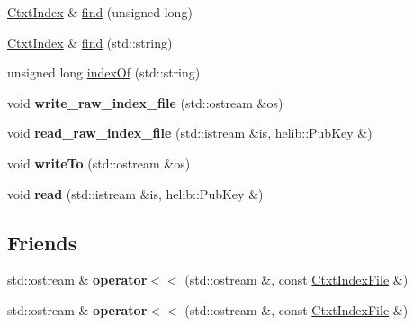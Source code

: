 \begin{DoxyCompactItemize}
\item 
\hyperlink{classHDB__supergate___1_1CtxtIndex}{Ctxt\+Index} \& \hyperlink{classHDB__supergate___1_1CtxtIndexFile_a22e64dc85f8e2ec050ee00820d31d083}{find} (unsigned long)
\item 
\hyperlink{classHDB__supergate___1_1CtxtIndex}{Ctxt\+Index} \& \hyperlink{classHDB__supergate___1_1CtxtIndexFile_aa579ec2799b316a65f426356ca76efd8}{find} (std\+::string)
\item 
unsigned long \hyperlink{classHDB__supergate___1_1CtxtIndexFile_abbc89b8e64ca3bcfe104c2371336bd9f}{index\+Of} (std\+::string)
\item 
\mbox{\label{classHDB__supergate___1_1CtxtIndexFile_a056ff9214e26089299c1873ac01cca77}} 
void {\bfseries write\+\_\+raw\+\_\+index\+\_\+file} (std\+::ostream \&os)
\item 
\mbox{\label{classHDB__supergate___1_1CtxtIndexFile_ae29e9a0c167adc7835adc20769f14a99}} 
void {\bfseries read\+\_\+raw\+\_\+index\+\_\+file} (std\+::istream \&is, helib\+::\+Pub\+Key \&)
\item 
\mbox{\label{classHDB__supergate___1_1CtxtIndexFile_a77cbe7cc6a4ebb0831786a2fa4864857}} 
void {\bfseries write\+To} (std\+::ostream \&os)
\item 
\mbox{\label{classHDB__supergate___1_1CtxtIndexFile_aadb472b58b9f21f2220f1150d05270af}} 
void {\bfseries read} (std\+::istream \&is, helib\+::\+Pub\+Key \&)
\end{DoxyCompactItemize}
\subsection*{Friends}
\begin{DoxyCompactItemize}
\item 
\mbox{\label{classHDB__supergate___1_1CtxtIndexFile_aa5b36e915d70e24d8de0f3fc3e64634d}} 
std\+::ostream \& {\bfseries operator$<$$<$} (std\+::ostream \&, const \hyperlink{classHDB__supergate___1_1CtxtIndexFile}{Ctxt\+Index\+File} \&)
\item 
\mbox{\label{classHDB__supergate___1_1CtxtIndexFile_aa5b36e915d70e24d8de0f3fc3e64634d}} 
std\+::ostream \& {\bfseries operator$<$$<$} (std\+::ostream \&, const \hyperlink{classHDB__supergate___1_1CtxtIndexFile}{Ctxt\+Index\+File} \&)
\end{DoxyCompactItemize}


